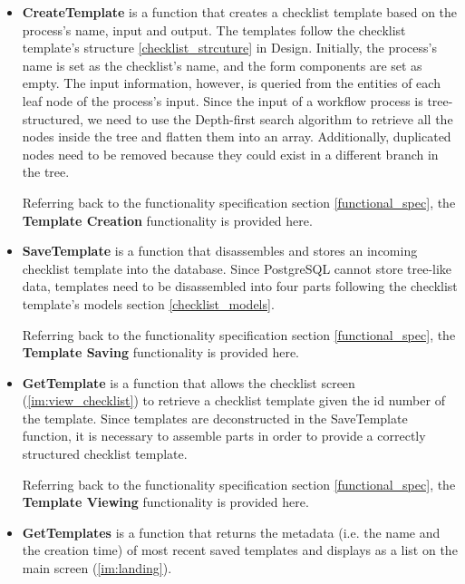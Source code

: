 \begin{itemize}
    \item \textbf{CreateTemplate} is a function that creates a checklist template based on the process's name, input and output.
    The templates follow the checklist template's structure \ref{checklist_strcuture} in Design. Initially, the process's name is set as the checklist's name, and the form components are set as empty. The input information, however, is queried from the entities of each leaf node of the process's input.
    Since the input of a workflow process is tree-structured, we need to use the Depth-first search algorithm \cite{dfs} to retrieve all the nodes inside the tree and flatten them into an array. Additionally, duplicated nodes need to be removed because they could exist in a different branch in the tree.
    
    Referring back to the functionality specification section \ref{functional_spec}, the \textbf{Template Creation} functionality is provided here.
    \item \textbf{SaveTemplate} is a function that disassembles and stores an incoming checklist template into the database.
    Since PostgreSQL cannot store tree-like data, templates need to be disassembled into four parts following the checklist template's models section \ref{checklist_models}.
    
    Referring back to the functionality specification section \ref{functional_spec}, the \textbf{Template Saving} functionality is provided here.
    \item \textbf{GetTemplate} is a function that allows the checklist screen (\ref{im:view_checklist}) to retrieve a checklist template given the id number of the template.
    Since templates are deconstructed in the SaveTemplate function, it is necessary to assemble parts in order to provide a correctly structured checklist template.
    
    Referring back to the functionality specification section \ref{functional_spec}, the \textbf{Template Viewing} functionality is provided here.
    \item \textbf{GetTemplates} is a function that returns the metadata (i.e. the name and the creation time) of most recent saved templates and displays as a list on the main screen (\ref{im:landing}).
    

\end{itemize}
